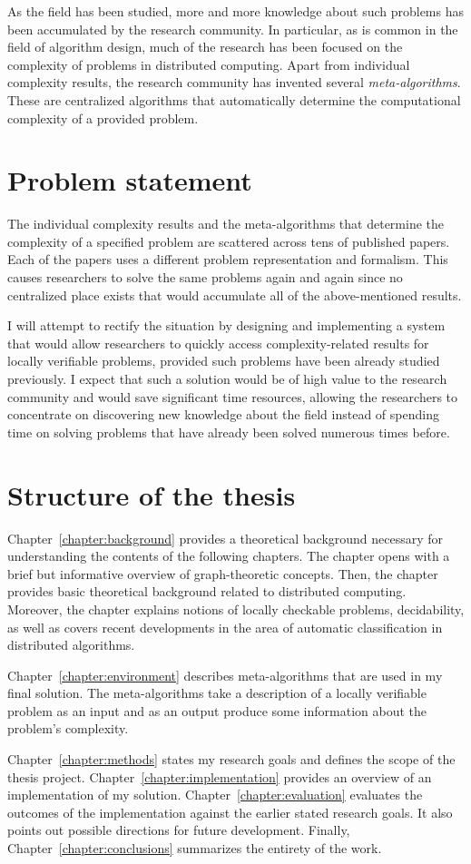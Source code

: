 As the field has been studied, more and more knowledge
about such problems has been accumulated by the
research community. In particular, as is common
in the field of algorithm design, much of the
research has been focused on the complexity of
problems in distributed computing. Apart from
individual complexity results, the research
community has invented several \emph{meta-algorithms}.
These are centralized algorithms that
automatically determine the
computational complexity of a provided
problem.

\section{Problem statement}

The individual complexity results and the meta-algorithms
that determine the complexity of a specified problem are
scattered across tens of published papers. Each of the
papers uses a different problem representation and
formalism. This causes researchers to solve
the same problems again and again since no
centralized place exists that would accumulate all of the
above-mentioned results.

I will attempt to rectify the
situation by designing and implementing a system
that would allow researchers to quickly
access complexity-related results for locally
verifiable problems, provided such problems have been
already studied
previously. I expect that such a solution
would be of high value to the research community and
would save significant time resources, allowing the researchers
to concentrate on discovering new knowledge about the
field instead of spending time on solving problems that
have already been solved numerous times before.

\section{Structure of the thesis}
\label{section:structure} 

Chapter~\ref{chapter:background} provides a theoretical
background necessary for understanding the contents of the
following chapters. The chapter opens with
a brief but informative overview of graph-theoretic
concepts. Then, the chapter provides basic
theoretical background related to distributed computing.
Moreover, the chapter explains notions of
locally checkable problems, decidability, as well as
covers recent developments in the area of
automatic classification in distributed algorithms.

Chapter~\ref{chapter:environment} describes
meta-algorithms that are used in my final
solution. The meta-algorithms take a description
of a locally verifiable problem as an input and
as an output produce some information about the
problem's complexity.

Chapter~\ref{chapter:methods} states my research goals
and defines the scope of the thesis project.
Chapter~\ref{chapter:implementation}
provides an overview of an implementation of
my solution. Chapter~\ref{chapter:evaluation}
evaluates the outcomes of the implementation
against the earlier stated research goals. It
also points out possible directions for
future development. Finally, Chapter~\ref{chapter:conclusions}
summarizes the entirety of the work.
